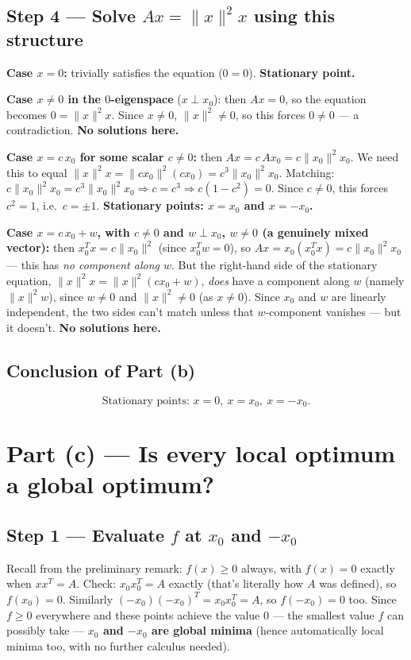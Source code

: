 \documentclass[11pt]{article}
\begin{document}
\subsection*{Step 4 --- Solve $Ax=\|x\|^2x$ using this structure}

\textbf{Case $x=0$:} trivially satisfies the equation ($0=0$). \textbf{Stationary point.}

\textbf{Case $x\ne0$ in the $0$-eigenspace} ($x\perp x_0$): then $Ax=0$, so the equation becomes $0=\|x\|^2x$. Since $x\ne0$, $\|x\|^2\ne0$, so this forces $0\ne0$ --- a contradiction. \textbf{No solutions here.}

\textbf{Case $x = c\,x_0$ for some scalar $c\ne0$:} then $Ax = c\,Ax_0 = c\|x_0\|^2x_0$. We need this to equal $\|x\|^2x = \|cx_0\|^2(cx_0) = c^3\|x_0\|^2x_0$. Matching: $c\|x_0\|^2x_0 = c^3\|x_0\|^2x_0 \Rightarrow c=c^3 \Rightarrow c(1-c^2)=0$. Since $c\ne0$, this forces $c^2=1$, i.e.\ $c=\pm1$. \textbf{Stationary points: $x=x_0$ and $x=-x_0$.}

\textbf{Case $x = c\,x_0+w$, with $c\ne0$ and $w\perp x_0$, $w\ne0$ (a genuinely mixed vector):} then $x_0^Tx = c\|x_0\|^2$ (since $x_0^Tw=0$), so $Ax = x_0(x_0^Tx) = c\|x_0\|^2x_0$ --- this has \emph{no component along $w$}. But the right-hand side of the stationary equation, $\|x\|^2x = \|x\|^2(cx_0+w)$, \emph{does} have a component along $w$ (namely $\|x\|^2w$), since $w\ne0$ and $\|x\|^2\ne0$ (as $x\ne0$). Since $x_0$ and $w$ are linearly independent, the two sides can't match unless that $w$-component vanishes --- but it doesn't. \textbf{No solutions here.}

\subsection*{Conclusion of Part (b)}

\[
\boxed{\text{Stationary points: } x=0,\ x=x_0,\ x=-x_0.}
\]

\section*{Part (c) --- Is every local optimum a global optimum?}

\subsection*{Step 1 --- Evaluate $f$ at $x_0$ and $-x_0$}

Recall from the preliminary remark: $f(x)\ge0$ always, with $f(x)=0$ exactly when $xx^T=A$. Check: $x_0x_0^T = A$ exactly (that's literally how $A$ was defined), so $f(x_0)=0$. Similarly $(-x_0)(-x_0)^T = x_0x_0^T = A$, so $f(-x_0)=0$ too. Since $f\ge0$ everywhere and these points achieve the value $0$ --- the smallest value $f$ can possibly take --- \textbf{$x_0$ and $-x_0$ are global minima} (hence automatically local minima too, with no further calculus needed).
\end{document}
